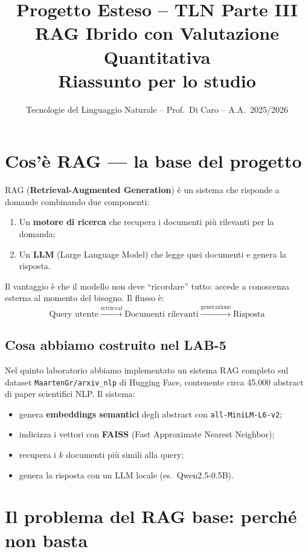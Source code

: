 \documentclass[12pt,a4paper]{article}
\title{\textbf{Progetto Esteso -- TLN Parte III}\\
\large RAG Ibrido con Valutazione Quantitativa\\
\normalsize Riassunto per lo studio}
\author{Tecnologie del Linguaggio Naturale -- Prof.\ Di Caro -- A.A.\ 2025/2026}
\date{}
\begin{document}
\maketitle
\tableofcontents
\newpage

\section{Cos'è RAG --- la base del progetto}

RAG (\textbf{Retrieval-Augmented Generation}) è un sistema che risponde a domande
combinando due componenti:
\begin{enumerate}
  \item Un \textbf{motore di ricerca} che recupera i documenti più rilevanti per la domanda;
  \item Un \textbf{LLM} (Large Language Model) che legge quei documenti e genera la risposta.
\end{enumerate}

Il vantaggio è che il modello non deve ``ricordare'' tutto: accede a conoscenza
esterna al momento del bisogno. Il flusso è:
\[
  \text{Query utente}
  \xrightarrow{\text{retrieval}}
  \text{Documenti rilevanti}
  \xrightarrow{\text{generazione}}
  \text{Risposta}
\]

\subsection{Cosa abbiamo costruito nel LAB-5}

Nel quinto laboratorio abbiamo implementato un sistema RAG completo sul dataset
\texttt{MaartenGr/arxiv\_nlp} di Hugging Face, contenente circa 45.000 abstract
di paper scientifici NLP. Il sistema:
\begin{itemize}
  \item genera \textbf{embeddings semantici} degli abstract con \texttt{all-MiniLM-L6-v2};
  \item indicizza i vettori con \textbf{FAISS} (Fast Approximate Nearest Neighbor);
  \item recupera i $k$ documenti più simili alla query;
  \item genera la risposta con un LLM locale (es.\ Qwen2.5-0.5B).
\end{itemize}

\section{Il problema del RAG base: perché non basta}
\end{document}
